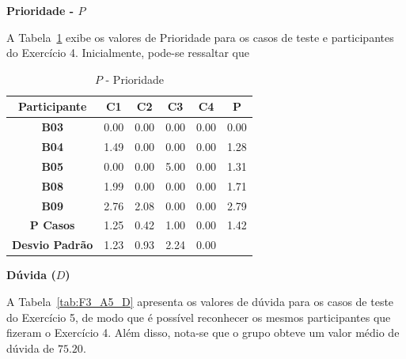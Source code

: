 \textbf{Prioridade - $P$}

A Tabela~\ref{tab:F3_A5_P} exibe os valores de Prioridade para os casos de teste e participantes do Exercício 4. Inicialmente, pode-se ressaltar que 

\begin{table}[htbp]
	\centering
	\caption{$P$ - Prioridade}
	\begin{tabular}{|c|c|c|c|c|c}
		\hline
		\rowcolor[HTML]{D9D9D9} 
		\textbf{Participante} & \textbf{C1} & \textbf{C2} & \textbf{C3} & \textbf{C4} & \multicolumn{1}{c|}{\cellcolor[HTML]{D9D9D9}\textbf{P}} \\ \hline
		\rowcolor[HTML]{FFFFFF} 
		\textbf{B03} & 0.00 & 0.00 & 0.00 & 0.00 & \multicolumn{1}{c|}{\cellcolor[HTML]{FFFFFF}0.00} \\ \hline
		\rowcolor[HTML]{E7E6E6} 
		\textbf{B04} & 1.49 & 0.00 & 0.00 & 0.00 & \multicolumn{1}{c|}{\cellcolor[HTML]{E7E6E6}1.28} \\ \hline
		\rowcolor[HTML]{FFFFFF} 
		\textbf{B05} & 0.00 & 0.00 & 5.00 & 0.00 & \multicolumn{1}{c|}{\cellcolor[HTML]{FFFFFF}1.31} \\ \hline
		\rowcolor[HTML]{E7E6E6} 
		\textbf{B08} & 1.99 & 0.00 & 0.00 & 0.00 & \multicolumn{1}{c|}{\cellcolor[HTML]{E7E6E6}1.71} \\ \hline
		\rowcolor[HTML]{FFFFFF} 
		\textbf{B09} & 2.76 & 2.08 & 0.00 & 0.00 & \multicolumn{1}{c|}{\cellcolor[HTML]{FFFFFF}2.79} \\ \hline
		\rowcolor[HTML]{D0CECE} 
		\textbf{P Casos} & 1.25 & 0.42 & 1.00 & 0.00 & \multicolumn{1}{c|}{\cellcolor[HTML]{D0CECE}1.42} \\ \hline
		\cellcolor[HTML]{FFFFFF}\textbf{Desvio Padrão} & \cellcolor[HTML]{FFFFFF}1.23 & \cellcolor[HTML]{FFFFFF}0.93 & \cellcolor[HTML]{FFFFFF}2.24 & \cellcolor[HTML]{FFFFFF}0.00 & \multicolumn{1}{l}{} \\ \cline{1-5}
	\end{tabular}
	\label{tab:F3_A5_P}
\end{table}

\textbf{Dúvida ($D$)}

A Tabela~\ref{tab:F3_A5_D} apresenta os valores de dúvida para os casos de teste do Exercício 5, de modo que é possível reconhecer os mesmos participantes que fizeram o Exercício 4. Além disso, nota-se que o grupo obteve um valor médio de dúvida de $75.20$.

